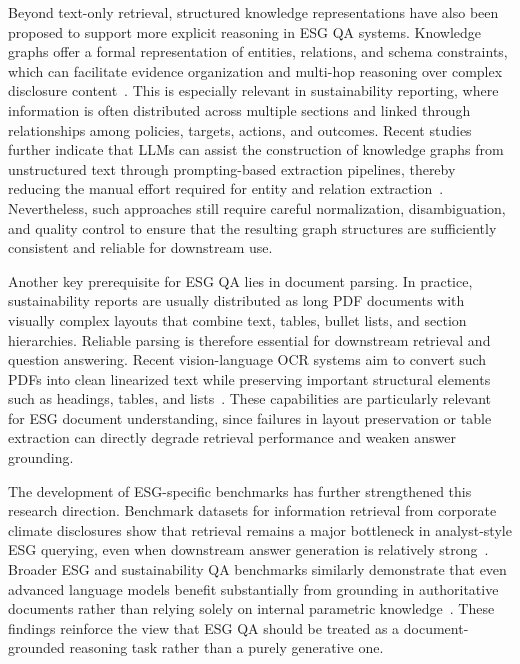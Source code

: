 \documentclass[sn-mathphys, oneside]{sn-jnl}
\begin{document}
Beyond text-only retrieval, structured knowledge representations have also been proposed to support more explicit reasoning in ESG QA systems. Knowledge graphs offer a formal representation of entities, relations, and schema constraints, which can facilitate evidence organization and multi-hop reasoning over complex disclosure content~\cite{hogan2021kg}. This is especially relevant in sustainability reporting, where information is often distributed across multiple sections and linked through relationships among policies, targets, actions, and outcomes. Recent studies further indicate that LLMs can assist the construction of knowledge graphs from unstructured text through prompting-based extraction pipelines, thereby reducing the manual effort required for entity and relation extraction~\cite{carta2023iterative,trajanoska2023enhancing}. Nevertheless, such approaches still require careful normalization, disambiguation, and quality control to ensure that the resulting graph structures are sufficiently consistent and reliable for downstream use.

Another key prerequisite for ESG QA lies in document parsing. In practice, sustainability reports are usually distributed as long PDF documents with visually complex layouts that combine text, tables, bullet lists, and section hierarchies. Reliable parsing is therefore essential for downstream retrieval and question answering. Recent vision-language OCR systems aim to convert such PDFs into clean linearized text while preserving important structural elements such as headings, tables, and lists~\cite{poznanski2025olmocr}. These capabilities are particularly relevant for ESG document understanding, since failures in layout preservation or table extraction can directly degrade retrieval performance and weaken answer grounding.

The development of ESG-specific benchmarks has further strengthened this research direction. Benchmark datasets for information retrieval from corporate climate disclosures show that retrieval remains a major bottleneck in analyst-style ESG querying, even when downstream answer generation is relatively strong~\cite{schimanski2024climretrieve}. Broader ESG and sustainability QA benchmarks similarly demonstrate that even advanced language models benefit substantially from grounding in authoritative documents rather than relying solely on internal parametric knowledge~\cite{he2025esgenius}. These findings reinforce the view that ESG QA should be treated as a document-grounded reasoning task rather than a purely generative one.
\end{document}
